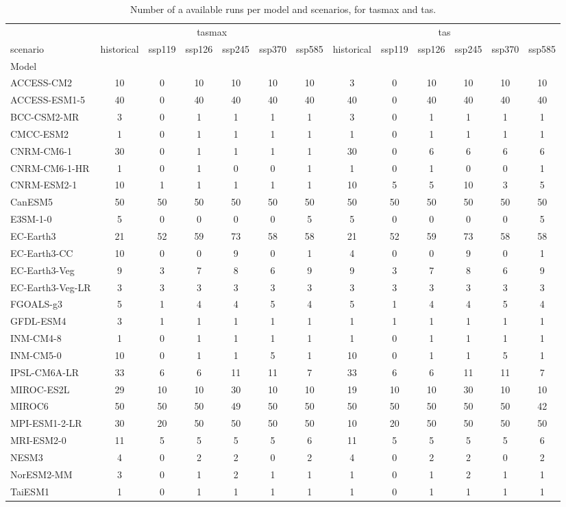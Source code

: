 \begin{table}
\caption{Number of a available runs per model and scenarios, for tasmax and tas.}
\label{tab:n_runs_per_model}
\begin{tabular}{lcccccc|cccccc}
\toprule
 & \multicolumn{6}{c}{tasmax} & \multicolumn{6}{c}{tas} \\
scenario & historical & ssp119 & ssp126 & ssp245 & ssp370 & ssp585 & historical & ssp119 & ssp126 & ssp245 & ssp370 & ssp585 \\
Model &  &  &  &  &  &  &  &  &  &  &  &  \\
\midrule
ACCESS-CM2 & 10 & 0 & 10 & 10 & 10 & 10 & 3 & 0 & 10 & 10 & 10 & 10 \\
ACCESS-ESM1-5 & 40 & 0 & 40 & 40 & 40 & 40 & 40 & 0 & 40 & 40 & 40 & 40 \\
BCC-CSM2-MR & 3 & 0 & 1 & 1 & 1 & 1 & 3 & 0 & 1 & 1 & 1 & 1 \\
CMCC-ESM2 & 1 & 0 & 1 & 1 & 1 & 1 & 1 & 0 & 1 & 1 & 1 & 1 \\
CNRM-CM6-1 & 30 & 0 & 1 & 1 & 1 & 1 & 30 & 0 & 6 & 6 & 6 & 6 \\
CNRM-CM6-1-HR & 1 & 0 & 1 & 0 & 0 & 1 & 1 & 0 & 1 & 0 & 0 & 1 \\
CNRM-ESM2-1 & 10 & 1 & 1 & 1 & 1 & 1 & 10 & 5 & 5 & 10 & 3 & 5 \\
CanESM5 & 50 & 50 & 50 & 50 & 50 & 50 & 50 & 50 & 50 & 50 & 50 & 50 \\
E3SM-1-0 & 5 & 0 & 0 & 0 & 0 & 5 & 5 & 0 & 0 & 0 & 0 & 5 \\
EC-Earth3 & 21 & 52 & 59 & 73 & 58 & 58 & 21 & 52 & 59 & 73 & 58 & 58 \\
EC-Earth3-CC & 10 & 0 & 0 & 9 & 0 & 1 & 4 & 0 & 0 & 9 & 0 & 1 \\
EC-Earth3-Veg & 9 & 3 & 7 & 8 & 6 & 9 & 9 & 3 & 7 & 8 & 6 & 9 \\
EC-Earth3-Veg-LR & 3 & 3 & 3 & 3 & 3 & 3 & 3 & 3 & 3 & 3 & 3 & 3 \\
FGOALS-g3 & 5 & 1 & 4 & 4 & 5 & 4 & 5 & 1 & 4 & 4 & 5 & 4 \\
GFDL-ESM4 & 3 & 1 & 1 & 1 & 1 & 1 & 1 & 1 & 1 & 1 & 1 & 1 \\
INM-CM4-8 & 1 & 0 & 1 & 1 & 1 & 1 & 1 & 0 & 1 & 1 & 1 & 1 \\
INM-CM5-0 & 10 & 0 & 1 & 1 & 5 & 1 & 10 & 0 & 1 & 1 & 5 & 1 \\
IPSL-CM6A-LR & 33 & 6 & 6 & 11 & 11 & 7 & 33 & 6 & 6 & 11 & 11 & 7 \\
MIROC-ES2L & 29 & 10 & 10 & 30 & 10 & 10 & 19 & 10 & 10 & 30 & 10 & 10 \\
MIROC6 & 50 & 50 & 50 & 49 & 50 & 50 & 50 & 50 & 50 & 50 & 50 & 42 \\
MPI-ESM1-2-LR & 30 & 20 & 50 & 50 & 50 & 50 & 10 & 20 & 50 & 50 & 50 & 50 \\
MRI-ESM2-0 & 11 & 5 & 5 & 5 & 5 & 6 & 11 & 5 & 5 & 5 & 5 & 6 \\
NESM3 & 4 & 0 & 2 & 2 & 0 & 2 & 4 & 0 & 2 & 2 & 0 & 2 \\
NorESM2-MM & 3 & 0 & 1 & 2 & 1 & 1 & 1 & 0 & 1 & 2 & 1 & 1 \\
TaiESM1 & 1 & 0 & 1 & 1 & 1 & 1 & 1 & 0 & 1 & 1 & 1 & 1 \\
\bottomrule
\end{tabular}
\end{table}
